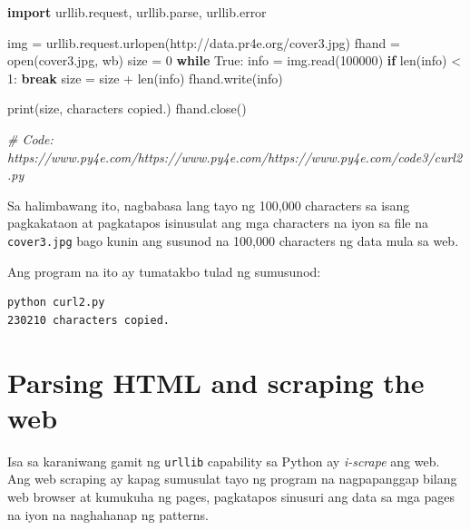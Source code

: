 \documentclass[10pt,]{book}
\newenvironment{Shaded}{}{}
\newcommand{\BuiltInTok}[1]{\textcolor[rgb]{0.00,0.50,0.00}{#1}}
\newcommand{\CommentTok}[1]{\textcolor[rgb]{0.38,0.63,0.69}{\textit{#1}}}
\newcommand{\ControlFlowTok}[1]{\textcolor[rgb]{0.00,0.44,0.13}{\textbf{#1}}}
\newcommand{\DecValTok}[1]{\textcolor[rgb]{0.25,0.63,0.44}{#1}}
\newcommand{\ImportTok}[1]{\textcolor[rgb]{0.00,0.50,0.00}{\textbf{#1}}}
\newcommand{\NormalTok}[1]{#1}
\newcommand{\OperatorTok}[1]{\textcolor[rgb]{0.40,0.40,0.40}{#1}}
\newcommand{\StringTok}[1]{\textcolor[rgb]{0.25,0.44,0.63}{#1}}
\newcommand{\VariableTok}[1]{\textcolor[rgb]{0.10,0.09,0.49}{#1}}
\begin{document}
\begin{Shaded}
\begin{Highlighting}[]
\ImportTok{import}\NormalTok{ urllib.request, urllib.parse, urllib.error}

\NormalTok{img }\OperatorTok{=}\NormalTok{ urllib.request.urlopen(}\StringTok{\textquotesingle{}http://data.pr4e.org/cover3.jpg\textquotesingle{}}\NormalTok{)}
\NormalTok{fhand }\OperatorTok{=} \BuiltInTok{open}\NormalTok{(}\StringTok{\textquotesingle{}cover3.jpg\textquotesingle{}}\NormalTok{, }\StringTok{\textquotesingle{}wb\textquotesingle{}}\NormalTok{)}
\NormalTok{size }\OperatorTok{=} \DecValTok{0}
\ControlFlowTok{while} \VariableTok{True}\NormalTok{:}
\NormalTok{    info }\OperatorTok{=}\NormalTok{ img.read(}\DecValTok{100000}\NormalTok{)}
    \ControlFlowTok{if} \BuiltInTok{len}\NormalTok{(info) }\OperatorTok{\textless{}} \DecValTok{1}\NormalTok{: }\ControlFlowTok{break}
\NormalTok{    size }\OperatorTok{=}\NormalTok{ size }\OperatorTok{+} \BuiltInTok{len}\NormalTok{(info)}
\NormalTok{    fhand.write(info)}

\BuiltInTok{print}\NormalTok{(size, }\StringTok{\textquotesingle{}characters copied.\textquotesingle{}}\NormalTok{)}
\NormalTok{fhand.close()}

\CommentTok{\# Code: https://www.py4e.com/https://www.py4e.com/https://www.py4e.com/code3/curl2.py}
\end{Highlighting}
\end{Shaded}

Sa halimbawang ito, nagbabasa lang tayo ng 100,000 characters sa isang
pagkakataon at pagkatapos isinusulat ang mga characters na iyon sa file
na \texttt{cover3.jpg} bago kunin ang susunod na 100,000 characters ng
data mula sa web.

Ang program na ito ay tumatakbo tulad ng sumusunod:

{\small
\begin{verbatim}
python curl2.py
230210 characters copied.
\end{verbatim}
}

\section{Parsing HTML and scraping the
web}\label{parsing-html-and-scraping-the-web}

 

Isa sa karaniwang gamit ng \texttt{urllib} capability sa Python ay
\emph{i-scrape} ang web. Ang web scraping ay kapag sumusulat tayo ng
program na nagpapanggap bilang web browser at kumukuha ng pages,
pagkatapos sinusuri ang data sa mga pages na iyon na naghahanap ng
patterns.
\end{document}
